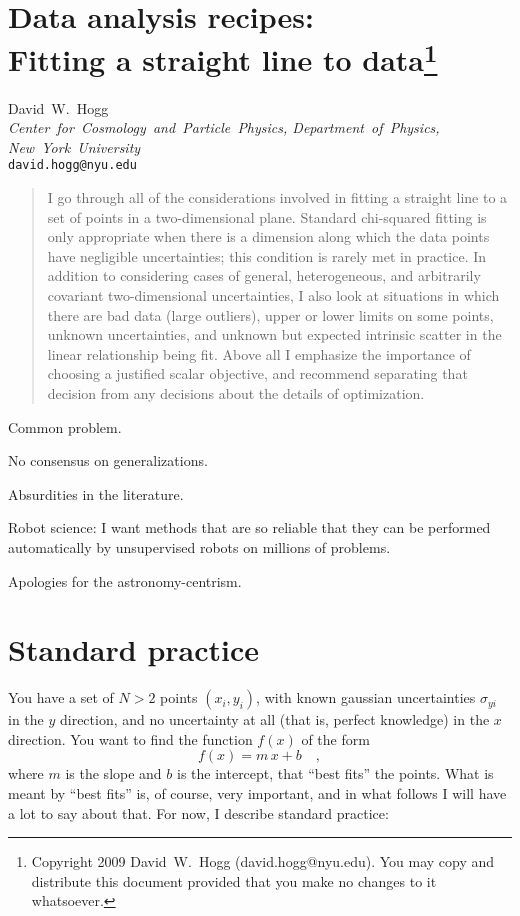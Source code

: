 \documentclass[12pt]{article}
\newcounter{problem}
\begin{document}
\section*{Data analysis recipes:\ \\
  Fitting a straight line to data\footnote{
    Copyright 2009 David~W.~Hogg (david.hogg@nyu.edu).  You may copy
    and distribute this document provided that you make no changes to
    it whatsoever.}}

\noindent
David~W.~Hogg\\
\textsl{Center~for~Cosmology~and~Particle~Physics, Department~of~Physics,\\
New~York~University}\\
\texttt{david.hogg@nyu.edu}

\begin{abstract}
  I go through all of the considerations involved in fitting a
  straight line to a set of points in a two-dimensional plane.
  Standard chi-squared fitting is only appropriate when there is a
  dimension along which the data points have negligible uncertainties;
  this condition is rarely met in practice.  In addition to
  considering cases of general, heterogeneous, and arbitrarily
  covariant two-dimensional uncertainties, I also look at situations
  in which there are bad data (large outliers), upper or lower limits
  on some points, unknown uncertainties, and unknown but expected
  intrinsic scatter in the linear relationship being fit.  Above all I
  emphasize the importance of choosing a justified scalar objective,
  and recommend separating that decision from any decisions about the
  details of optimization.
\end{abstract}

Common problem.

No consensus on generalizations.

Absurdities in the literature.

Robot science: I want methods that are so reliable that they can be
performed automatically by unsupervised robots on millions of
problems.

Apologies for the astronomy-centrism.

\section{Standard practice}\label{sec:standard}

You have a set of $N>2$ points $(x_i,y_i)$, with known gaussian
uncertainties $\sigma_{yi}$ in the $y$ direction, and no uncertainty
at all (that is, perfect knowledge) in the $x$ direction.  You want to
find the function $f(x)$ of the form
\begin{equation}\label{eq:fofx}
f(x) = m\,x + b \quad ,
\end{equation}
where $m$ is the slope and $b$ is the intercept, that ``best fits''
the points.  What is meant by ``best fits'' is, of course, very
important, and in what follows I will have a lot to say about that.
For now, I describe standard practice:
\end{document}
